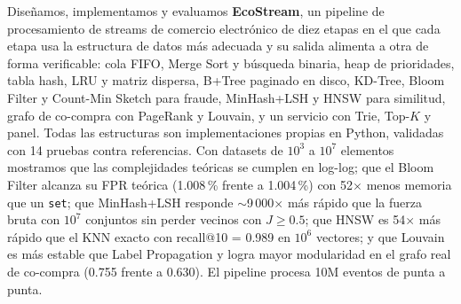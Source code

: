 Diseñamos, implementamos y evaluamos \textbf{EcoStream}, un pipeline de procesamiento de streams de comercio electrónico de diez etapas en el que cada etapa usa la
estructura de datos más adecuada y su salida alimenta a otra de forma verificable: cola FIFO, Merge Sort y búsqueda binaria, heap de prioridades, tabla hash, LRU y matriz
dispersa, B+Tree paginado en disco, KD-Tree, Bloom Filter y Count-Min Sketch para fraude, MinHash+LSH y HNSW para similitud, grafo de co-compra con PageRank y Louvain, y
un servicio con Trie, Top-$K$ y panel. Todas las estructuras son implementaciones propias en Python, validadas con 14 pruebas contra referencias. Con datasets de
$10^3$ a $10^7$ elementos mostramos que las complejidades teóricas se cumplen en log-log; que el Bloom Filter alcanza su FPR teórica (1.008\,\% frente a 1.004\,\%) con
52$\times$ menos memoria que un \texttt{set}; que MinHash+LSH responde $\sim$9\,000$\times$ más rápido que la fuerza bruta con $10^7$ conjuntos sin perder vecinos con
$J\ge0.5$; que HNSW es 54$\times$ más rápido que el KNN exacto con recall@10 = 0.989 en $10^6$ vectores; y que Louvain es más estable que Label Propagation y logra mayor
modularidad en el grafo real de co-compra (0.755 frente a 0.630). El pipeline procesa 10M eventos de punta a punta.
